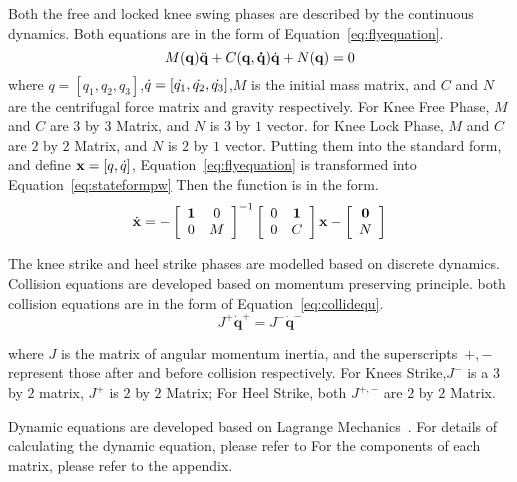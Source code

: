 \begin{itemize}
Both the free and locked knee swing phases are described by the continuous dynamics.
Both equations are in the form of Equation~\ref{eq:flyequation}.
\begin{equation}
\label{eq:flyequation}
M(\mathbf{q}) \ddot{\mathbf{q}} + C(\mathbf{q,\dot{q}})\dot{\mathbf{q}} + N(\mathbf{q}) = 0
\end{equation}
where $q=[q_1,q_2,q_3]$,$\dot{q}=[\dot{q_1},\dot{q_2},\dot{q_3}]$,$M$ is the initial mass matrix,  and $C$ and $N$ are the centrifugal force matrix and gravity respectively. 
For Knee Free Phase,  $M$ and $C$ are $3$ by $3$ Matrix, and $N$ is $3$ by $1$ vector.
for Knee Lock Phase, $M$ and $C$ are $2$ by $2$ Matrix, and $N$ is $2$ by $1$ vector.
Putting them into the standard form, and define $\mathbf{x}=[q,\dot{q}]$, Equation~\ref{eq:flyequation} is transformed into Equation~\ref{eq:stateformpw}
Then the function is in the form.
\begin{equation}
\label{eq:stateformpw}
\dot{\mathbf{x}}=
-\left[ 
\begin{array}{cc}
\mathbf{1} &0\\
0 &M 
\end{array}
\right]^{-1}
\left[ 
\begin{array}{cc}
0 &\mathbf{1}\\
0 &C 
\end{array}
\right]\mathbf{x}
-\left[ 
\begin{array}{c}
\mathbf{0}\\
 N 
\end{array}
\right]
\end{equation}

The knee strike and heel strike phases are modelled based on discrete dynamics.
Collision equations are developed based on momentum preserving principle.
both collision equations are in the form of Equation~\ref{eq:collidequ}.
\begin{equation}
\label{eq:collidequ}
J^{+}\dot{\mathbf{q}}^{+} = J^{-}\dot{\mathbf{q}}^{-}
\end{equation}

where $J$ is the matrix of angular momentum inertia, and the superscripts~$+,-$ represent those after and before collision respectively.
For Knees Strike,$J^-$ is a $3$ by $2$ matrix, $J^+$ is $2$ by $2$ Matrix;
For Heel Strike, both $J^{+,-}$ are $2$ by $2$ Matrix.
\end{itemize}
Dynamic equations are developed based on Lagrange Mechanics~\citep{Goldstein2002}.
For details of calculating the dynamic equation, please refer to \citep{Chen2007}
For the components of each matrix, please refer to the appendix.


